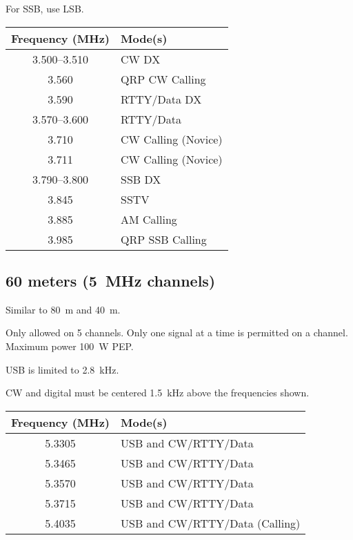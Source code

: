 \documentclass[11pt, onecolumn, table]{article}
\begin{document}
For SSB, use LSB.
\begin{center}
  \begin{tabular}{S l}
    {Frequency (\si{\MHz})}	& Mode(s)				\\
    \midrule
    \numrange{3.500}{3.510}	& CW DX					\\
    \num{3.560}				& QRP CW Calling		\\
    \num{3.590}				& RTTY/Data DX			\\
    \numrange{3.570}{3.600}	& RTTY/Data				\\
    \num{3.710}				& CW Calling (Novice) 	\\
    \num{3.711}				& CW Calling (Novice)	\\
    \numrange{3.790}{3.800}	& SSB DX				\\
    \num{3.845}				& SSTV					\\
    \num{3.885}				& AM Calling			\\
    \num{3.985}				& QRP SSB Calling		\\
  \end{tabular}
\end{center}


\subsection{60 meters (\SI{5}{\MHz} channels)}
Similar to \SI{80}{\m} and \SI{40}{m}. 

Only allowed on 5 channels. Only one signal at a time is permitted
on a channel. Maximum power \SI{100}{\W} PEP.

USB is limited to \SI{2.8}{\kHz}.

CW and digital must be centered \SI{1.5}{\kHz} above the frequencies shown.

\begin{center}
  \begin{tabular}{S l}
    {Frequency (\si{\MHz})}	& Mode(s)							\\
    \midrule
    \num{5.3305}			& USB and CW/RTTY/Data				\\
    \num{5.3465}			& USB and CW/RTTY/Data				\\
    \num{5.3570}			& USB and CW/RTTY/Data				\\
    \num{5.3715}			& USB and CW/RTTY/Data				\\
    \num{5.4035}			& USB and CW/RTTY/Data (Calling)	\\
  \end{tabular}
\end{center}
\end{document}
